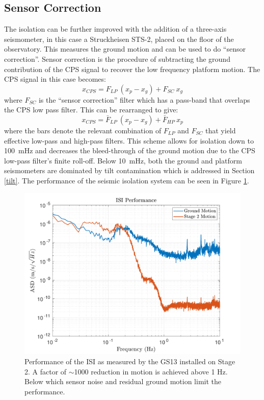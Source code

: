 \documentclass [12pt, proquest]{uwthesis}[2019]
\begin{document}
\subsection{Sensor Correction}\label{SensCor}

The isolation can be further improved with the addition of a three-axis seismometer, in this case a Struckheisen STS-2, placed on the floor of the observatory. This measures the ground motion and can be used to do ``sensor correction''. Sensor correction is the procedure of subtracting the ground contribution of the CPS signal to recover the low frequency platform motion. The CPS signal in this case becomes:
\begin{equation}
x_{CPS}=F_{LP}\ (x_p-x_g)+F_{SC}\ x_g
\end{equation}
where $F_{SC}$ is the ``sensor correction'' filter which has a pass-band that overlaps the CPS low pass filter. This can be rearranged to give:
\begin{equation}
x_{CPS}=\bar{ F}_{LP}\ (x_p-x_g)+\bar{F}_{HP}\ x_p
\end{equation}
where the bars denote the relevant combination of $F_{LP}$ and $F_{SC}$ that yield effective low-pass and high-pass filters. This scheme allows for isolation down to 100~mHz and decreases the bleed-through of the  ground motion due to the CPS low-pass filter's finite roll-off. Below 10~mHz, both the ground and platform seismometers are dominated by tilt contamination which is addressed in Section \ref{tilt}. The performance of the seismic isolation system can be seen in Figure \ref{ISIPerf}.

\begin{figure}[!h]
\begin{center}
\includegraphics[width=\textwidth]{ISIPerf.pdf}
\caption[Performance of the ISI]{Performance of the ISI as measured by the GS13 installed on Stage 2. A factor of $\sim$1000 reduction in motion is achieved above 1 Hz. Below which sensor noise and residual ground motion limit the performance.}
\label{ISIPerf}
\end{center}
\end{figure}
\end{document}
